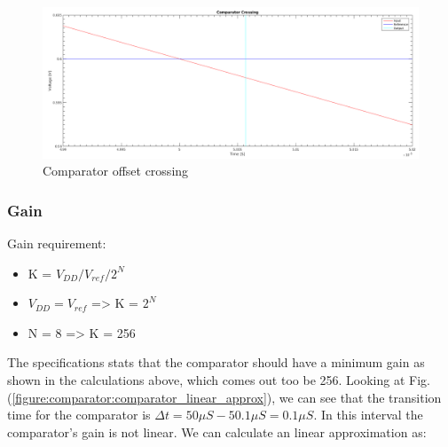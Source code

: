 \documentclass[english, 12pt, a4paper]{ifimaster}
\begin{document}
\begin{figure}[!ht]
    \centering
    \includegraphics[width=\textwidth]{img/comparator/comparator_crossing}
    \caption{Comparator offset crossing}
    \label{figure:comparator:comparator_crossing}
\end{figure}

\subsubsection{Gain}

Gain requirement:
\begin{itemize}
\item K = \(V_{DD}/V_{ref}/2^N\)
\item \(V_{DD} = V_{ref}\) => K = \(2^N\)
\item N = 8 => K = 256 

\end{itemize}

\noindent
The specifications stats that the comparator should have a minimum gain as shown in the calculations above, which comes out too be 256.
Looking at Fig. (\ref{figure:comparator:comparator_linear_approx}), we can see that the transition time for the comparator is \(\Delta t = 50\mu S - 50.1\mu S = 0.1\mu S \).
In this interval the comparator's gain is not linear. We can calculate an linear approximation as:
\end{document}
